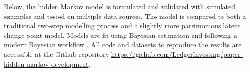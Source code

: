 Below, the hidden Markov model is formulated
and validated with simulated examples and 
tested on multiple data sources. 
The model is compared to both a traditional
two-step modelling process and a slightly
more parsimonious latent
change-point model.
Models are fit using Bayesian estimation
and following a modern Bayesian
workflow \citep{gelman2020}.
All code and datasets to 
reproduce the results
are accessible at the Github repository
\url{https://github.com/LedgerInvesting/paper-hidden-markov-development}.

